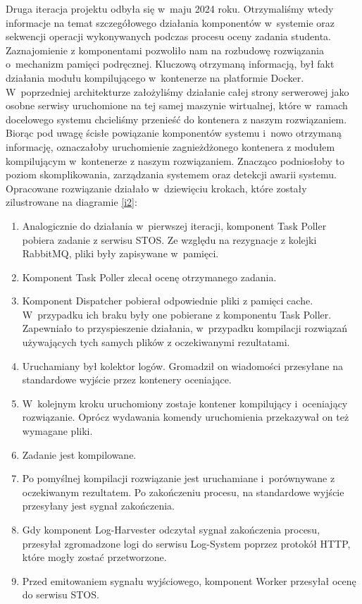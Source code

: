 \newline \indent Druga iteracja projektu odbyła się w~maju 2024 roku. Otrzymaliśmy wtedy informacje na temat szczegółowego działania komponentów w~systemie oraz sekwencji operacji wykonywanych podczas procesu oceny zadania studenta. Zaznajomienie z komponentami pozwoliło nam na rozbudowę rozwiązania o~mechanizm pamięci podręcznej. Kluczową otrzymaną informacją, był fakt działania modułu kompilującego w~kontenerze na platformie Docker. W~poprzedniej architekturze założyliśmy działanie całej strony serwerowej jako osobne serwisy uruchomione na tej samej maszynie wirtualnej, które w~ramach docelowego systemu chcieliśmy przenieść do kontenera z naszym rozwiązaniem. Biorąc pod uwagę ścisłe powiązanie komponentów systemu i~nowo otrzymaną informację, oznaczałoby uruchomienie zagnieżdżonego kontenera z modułem kompilującym w~kontenerze z naszym rozwiązaniem. Znacząco podniosłoby to poziom skomplikowania, zarządzania systemem oraz detekcji awarii systemu. Opracowane rozwiązanie działało w~dziewięciu krokach, które zostały zilustrowane na diagramie \ref{i2}:
\begin{enumerate}
	\item Analogicznie do działania w~pierwszej iteracji, komponent Task Poller pobiera zadanie z serwisu STOS. Ze względu na rezygnacje z kolejki RabbitMQ, pliki były zapisywane w~pamięci.
	\item Komponent Task Poller zlecał ocenę otrzymanego zadania.
	\item Komponent Dispatcher pobierał odpowiednie pliki z pamięci cache. W~przypadku ich braku były one pobierane z komponentu Task Poller. Zapewniało to przyspieszenie działania, w~przypadku kompilacji rozwiązań używających tych samych plików z oczekiwanymi rezultatami.
	\item Uruchamiany był kolektor logów. Gromadził on wiadomości przesyłane na standardowe wyjście przez kontenery oceniające.
	\item W~kolejnym kroku uruchomiony zostaje kontener kompilujący i~oceniający rozwiązanie. Oprócz wydawania komendy uruchomienia przekazywał on też wymagane pliki.
	\item Zadanie jest kompilowane.
	\item Po pomyślnej kompilacji rozwiązanie jest uruchamiane i~porównywane z oczekiwanym rezultatem. Po zakończeniu procesu, na standardowe wyjście przesyłany jest sygnał zakończenia.
	\item Gdy komponent Log-Harvester odczytał sygnał zakończenia procesu, przesyłał zgromadzone logi do serwisu Log-System poprzez protokół HTTP, które mogły zostać przetworzone.
	\item Przed emitowaniem sygnału wyjściowego, komponent Worker przesyłał ocenę do serwisu STOS.
\end{enumerate}
